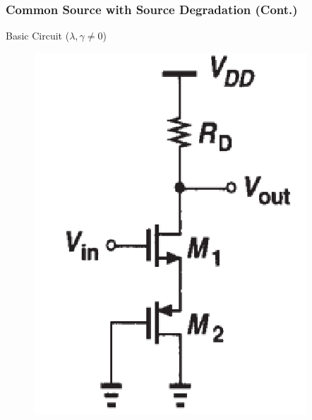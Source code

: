 \documentclass{beamer}
\begin{document}
\begin{frame}
    \frametitle{Common Source with Source Degradation (Cont.)}
    \begin{minipage}{0.45\linewidth}
        Basic Circuit ($\lambda, \gamma\not= 0$)
        \begin{figure}[H]
            \centering
            \includegraphics[width=0.8\linewidth]{degradation-D.png}
        \end{figure}
         

\end{minipage}
\end{frame}
\end{document}
